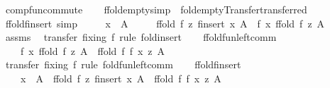 \begin{isabellebody}
\endisatagproof
{\isafoldproof}%
%
\isadelimproof
%
\endisadelimproof
%
\isadelimdocument
%
\endisadelimdocument
%
\isatagdocument
%
\isamarkuptrue%
%
\endisatagdocument
{\isafolddocument}%
%
\isadelimdocument
%
\endisadelimdocument
{}\isamarkupfalse%
\ comp{\isacharunderscore}fun{\isacharunderscore}commute\isanewline
{}\isanewline
\ \ \isamarkupfalse%
\ ffold{\isacharunderscore}empty{\isacharbrackleft}simp{\isacharbrackright}\ {\isacharequal}\ fold{\isacharunderscore}empty{\isacharbrackleft}Transfer{\isachardot}transferred{\isacharbrackright}\isanewline
\isanewline
\ \ \isamarkupfalse%
\ ffold{\isacharunderscore}finsert\ {\isacharbrackleft}simp{\isacharbrackright}{\isacharcolon}\isanewline
\ \ \ \ \ {\isachardoublequoteopen}x\ {\isacharbar}{\isasymnotin}{\isacharbar}\ A{\isachardoublequoteclose}\isanewline
\ \ \ \ \ {\isachardoublequoteopen}ffold\ f\ z\ {\isacharparenleft}finsert\ x\ A{\isacharparenright}\ {\isacharequal}\ f\ x\ {\isacharparenleft}ffold\ f\ z\ A{\isacharparenright}{\isachardoublequoteclose}\isanewline
%
\isadelimproof
\ \ \ \ %
\endisadelimproof
%
\isatagproof
{}\isamarkupfalse%
\ assms\ \isamarkupfalse%
\ {\isacharparenleft}transfer\ fixing{\isacharcolon}\ f{\isacharparenright}\ {\isacharparenleft}rule\ fold{\isacharunderscore}insert{\isacharparenright}%
\endisatagproof
{\isafoldproof}%
%
\isadelimproof
\isanewline
%
\endisadelimproof
\isanewline
\ \ \isamarkupfalse%
\ ffold{\isacharunderscore}fun{\isacharunderscore}left{\isacharunderscore}comm{\isacharcolon}\isanewline
\ \ \ \ {\isachardoublequoteopen}f\ x\ {\isacharparenleft}ffold\ f\ z\ A{\isacharparenright}\ {\isacharequal}\ ffold\ f\ {\isacharparenleft}f\ x\ z{\isacharparenright}\ A{\isachardoublequoteclose}\isanewline
%
\isadelimproof
\ \ \ \ %
\endisadelimproof
%
\isatagproof
{}\isamarkupfalse%
\ {\isacharparenleft}transfer\ fixing{\isacharcolon}\ f{\isacharparenright}\ {\isacharparenleft}rule\ fold{\isacharunderscore}fun{\isacharunderscore}left{\isacharunderscore}comm{\isacharparenright}%
\endisatagproof
{\isafoldproof}%
%
\isadelimproof
\isanewline
%
\endisadelimproof
\isanewline
\ \ \isamarkupfalse%
\ ffold{\isacharunderscore}finsert{}{\isacharcolon}\isanewline
\ \ \ \ {\isachardoublequoteopen}x\ {\isacharbar}{\isasymnotin}{\isacharbar}\ A\ {\isasymLongrightarrow}\ ffold\ f\ z\ {\isacharparenleft}finsert\ x\ A{\isacharparenright}\ {\isacharequal}\ ffold\ f\ {\isacharparenleft}f\ x\ z{\isacharparenright}\ A{\isachardoublequoteclose}\isanewline

\end{isabellebody}

